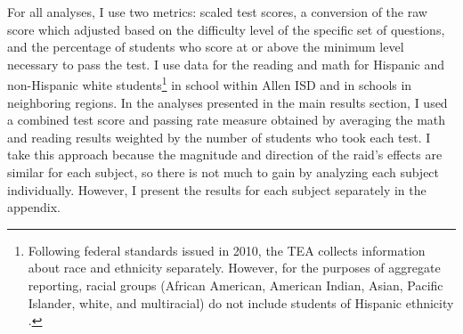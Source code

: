 \documentclass[hidelinks,twoside]{article}
\begin{document}
For all analyses, I use two metrics: scaled test scores, a conversion of the raw score which adjusted based on the difficulty level of the specific set of questions, and the percentage of students who score at or above the minimum level necessary to pass the test. I use data for the reading and math for Hispanic and non-Hispanic white students\footnote{Following federal standards issued in 2010, the TEA collects information about race and ethnicity separately. However, for the purposes of aggregate reporting, racial groups (African American, American Indian, Asian, Pacific Islander, white, and multiracial) do not include students of Hispanic ethnicity \citep{tea_ethnicity_req}.} in school within Allen ISD and in schools in neighboring regions. In the analyses presented in the main results section, I used a combined test score and passing rate measure obtained by averaging the math and reading results weighted by the number of students who took each test. I take this approach because the magnitude and direction of the raid's effects are similar for each subject, so there is not much to gain by analyzing each subject individually. However, I present the results for each subject separately in the appendix. 
\end{document}

